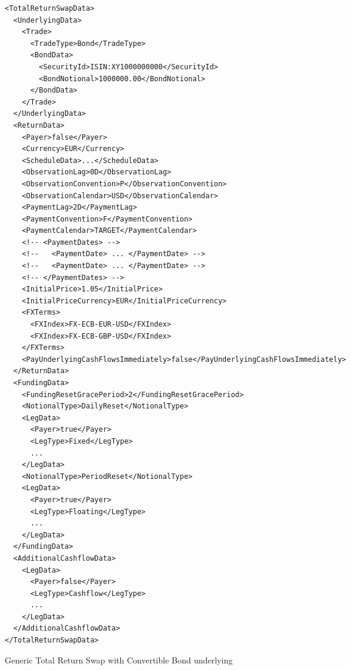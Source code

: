 \begin{listing}[H]
\begin{verbatim}
<TotalReturnSwapData>
  <UnderlyingData>
    <Trade>
      <TradeType>Bond</TradeType>
      <BondData>
        <SecurityId>ISIN:XY1000000000</SecurityId>
        <BondNotional>1000000.00</BondNotional>
      </BondData>
    </Trade>
  </UnderlyingData>
  <ReturnData>
    <Payer>false</Payer>
    <Currency>EUR</Currency>
    <ScheduleData>...</ScheduleData>
    <ObservationLag>0D</ObservationLag>
    <ObservationConvention>P</ObservationConvention>
    <ObservationCalendar>USD</ObservationCalendar>
    <PaymentLag>2D</PaymentLag>
    <PaymentConvention>F</PaymentConvention>
    <PaymentCalendar>TARGET</PaymentCalendar>
    <!-- <PaymentDates> -->
    <!--   <PaymentDate> ... </PaymentDate> -->
    <!--   <PaymentDate> ... </PaymentDate> -->
    <!-- </PaymentDates> -->
    <InitialPrice>1.05</InitialPrice>
    <InitialPriceCurrency>EUR</InitialPriceCurrency>
    <FXTerms>
      <FXIndex>FX-ECB-EUR-USD</FXIndex>
      <FXIndex>FX-ECB-GBP-USD</FXIndex>
    </FXTerms>
    <PayUnderlyingCashFlowsImmediately>false</PayUnderlyingCashFlowsImmediately>
  </ReturnData>
  <FundingData>
    <FundingResetGracePeriod>2</FundingResetGracePeriod>
    <NotionalType>DailyReset</NotionalType>
    <LegData>
      <Payer>true</Payer>
      <LegType>Fixed</LegType>
      ...
    </LegData>
    <NotionalType>PeriodReset</NotionalType>
    <LegData>
      <Payer>true</Payer>
      <LegType>Floating</LegType>
      ...
    </LegData>
  </FundingData>
  <AdditionalCashflowData>
    <LegData>
      <Payer>false</Payer>
      <LegType>Cashflow</LegType>
      ...
    </LegData>
  </AdditionalCashflowData>
</TotalReturnSwapData>
\end{verbatim}
\caption{Generic Total Return Swap with Convertible Bond underlying}
\label{lst:trsdata}
\end{listing}

